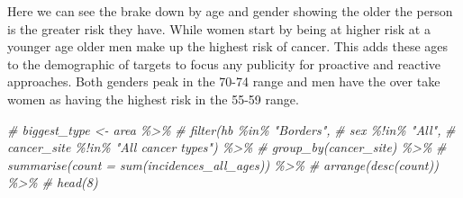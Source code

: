 \documentclass[
]{article}
\newenvironment{Shaded}{\begin{snugshade}}{\end{snugshade}}
\newcommand{\CommentTok}[1]{\textcolor[rgb]{0.56,0.35,0.01}{\textit{#1}}}
\begin{document}
Here we can see the brake down by age and gender showing the older the
person is the greater risk they have. While women start by being at
higher risk at a younger age older men make up the highest risk of
cancer. This adds these ages to the demographic of targets to focus any
publicity for proactive and reactive approaches. Both genders peak in
the 70-74 range and men have the over take women as having the highest
risk in the 55-59 range.

\begin{Shaded}
\begin{Highlighting}[]
\CommentTok{\# biggest\_type \textless{}{-} area \%\textgreater{}\% }
\CommentTok{\#   filter(hb \%in\% "Borders",}
\CommentTok{\#          sex \%!in\% "All",}
\CommentTok{\#          cancer\_site \%!in\% "All cancer types") \%\textgreater{}\%}
\CommentTok{\#   group\_by(cancer\_site) \%\textgreater{}\% }
\CommentTok{\#   summarise(count = sum(incidences\_all\_ages)) \%\textgreater{}\% }
\CommentTok{\#   arrange(desc(count)) \%\textgreater{}\% }
\CommentTok{\#   head(8)}



\end{Highlighting}
\end{Shaded}
\end{document}
